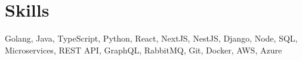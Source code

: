 
\section{Skills}

\begin{itemize}[leftmargin=0.15in, label={}]

\small{\item{{Golang, Java, TypeScript, Python, React, NextJS, NestJS, Django, Node, SQL, Microservices, REST API, GraphQL, RabbitMQ, Git, Docker, AWS, Azure} }}

\end{itemize}

